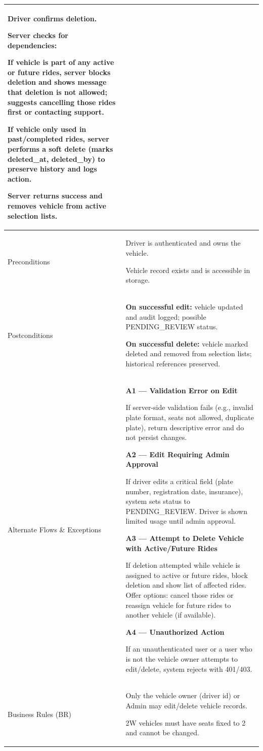 \begin{longtable}{|p{3.5cm}|p{12cm}|}
Driver confirms deletion.

Server checks for dependencies:

If vehicle is part of any active or future rides, server blocks deletion and shows message that deletion is not allowed; suggests cancelling those rides first or contacting support.

If vehicle only used in past/completed rides, server performs a soft delete (marks deleted\_at, deleted\_by) to preserve history and logs action.

Server returns success and removes vehicle from active selection lists. \\
\hline
Preconditions &
Driver is authenticated and owns the vehicle.

Vehicle record exists and is accessible in storage. \\
\hline
Postconditions &
\textbf{On successful edit:} vehicle updated and audit logged; possible PENDING\_REVIEW status.

\textbf{On successful delete:} vehicle marked deleted and removed from selection lists; historical references preserved. \\
\hline
Alternate Flows \& Exceptions &
\textbf{A1 --- Validation Error on Edit}

If server-side validation fails (e.g., invalid plate format, seats not allowed, duplicate plate), return descriptive error and do not persist changes.

\textbf{A2 --- Edit Requiring Admin Approval}

If driver edits a critical field (plate number, registration date, insurance), system sets status to PENDING\_REVIEW. Driver is shown limited usage until admin approval.

\textbf{A3 --- Attempt to Delete Vehicle with Active/Future Rides}

If deletion attempted while vehicle is assigned to active or future rides, block deletion and show list of affected rides. Offer options: cancel those rides or reassign vehicle for future rides to another vehicle (if available).

\textbf{A4 --- Unauthorized Action}

If an unauthenticated user or a user who is not the vehicle owner attempts to edit/delete, system rejects with 401/403. \\
\hline
Business Rules (BR) &
Only the vehicle owner (driver id) or Admin may edit/delete vehicle records.

2W vehicles must have seats fixed to 2 and cannot be changed.


\end{longtable}

